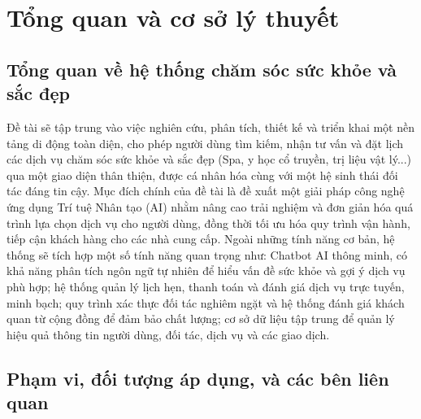\chapter{Tổng quan và cơ sở lý thuyết}

\section{Tổng quan về hệ thống chăm sóc sức khỏe và sắc đẹp}
Đề tài sẽ tập trung vào việc nghiên cứu, phân tích, thiết kế và triển khai một nền tảng di động toàn diện, cho phép người dùng tìm kiếm, nhận tư vấn và đặt lịch các dịch vụ chăm sóc sức khỏe và sắc đẹp (Spa, y học cổ truyền, trị liệu vật lý...) qua một giao diện thân thiện, được cá nhân hóa cùng với một hệ sinh thái đối tác đáng tin cậy. Mục đích chính của đề tài là đề xuất một giải pháp công nghệ ứng dụng Trí tuệ Nhân tạo (AI) nhằm nâng cao trải nghiệm và đơn giản hóa quá trình lựa chọn dịch vụ cho người dùng, đồng thời tối ưu hóa quy trình vận hành, tiếp cận khách hàng cho các nhà cung cấp. Ngoài những tính năng cơ bản, hệ thống sẽ tích hợp một số tính năng quan trọng như: Chatbot AI thông minh, có khả năng phân tích ngôn ngữ tự nhiên để hiểu vấn đề sức khỏe và gợi ý dịch vụ phù hợp; hệ thống quản lý lịch hẹn, thanh toán và đánh giá dịch vụ trực tuyến, minh bạch; quy trình xác thực đối tác nghiêm ngặt và hệ thống đánh giá khách quan từ cộng đồng để đảm bảo chất lượng; cơ sở dữ liệu tập trung để quản lý hiệu quả thông tin người dùng, đối tác, dịch vụ và các giao dịch.

\section{Phạm vi, đối tượng áp dụng, và các bên liên quan}
